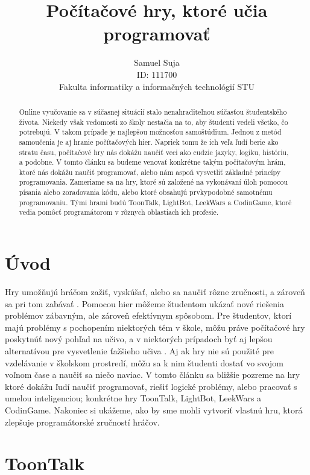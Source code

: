 \documentclass[slovak,a4paper,11pt]{article}
\title{Počítačové hry, ktoré učia programovať}
\author{Samuel Suja \\ ID: 111700 \\ Fakulta informatiky a informačných technológií STU}
\begin{document}
\maketitle
\tableofcontents

\begin{abstract}

Online vyučovanie sa v súčasnej situácií stalo nenahraditeľnou súčasťou študentského života. Niekedy však vedomosti zo školy nestačia na to, aby študenti vedeli všetko, čo potrebujú. V takom prípade je najlepšou možnosťou samoštúdium. Jednou z metód samoučenia je aj hranie počítačových hier. Napriek tomu že ich veľa ľudí berie ako stratu času, počítačové hry nás dokážu naučiť veci ako cudzie jazyky, logiku, históriu, a podobne. V tomto článku sa budeme venovať konkrétne takým počítačovým hrám, ktoré nás dokážu naučiť programovať, alebo nám aspoň vysvetliť základné princípy programovania. Zameriame sa na hry, ktoré sú založené na vykonávaní úloh pomocou písania alebo zoraďovania kódu, alebo ktoré obsahujú prvkypodobné samotnému programovaniu. Tými hrami budú ToonTalk, LightBot, LeekWars a CodinGame, ktoré vedia pomôcť programátorom v rôznych oblastiach ich profesie.

\end{abstract}

\section{Úvod}

Hry umožňujú hráčom zažiť, vyskúšať, alebo sa naučiť rôzne zručnosti, a zároveň sa pri tom zabávať \cite{burgos2007re}. Pomocou hier môžeme študentom ukázať nové riešenia problémov zábavným, ale zároveň efektívnym spôsobom. Pre študentov, ktorí majú problémy s pochopením niektorých tém v škole, môžu práve počítačové hry poskytnúť nový pohľad na učivo, a v niektorých prípadoch byť aj lepšou alternatívou pre vysvetlenie ťažšieho učiva \cite{seng2014computer}. Aj ak hry nie sú použité pre vzdelávanie v školskom prostredí, môžu sa k nim študenti dostať vo svojom voľnom čase a naučiť sa niečo naviac. V tomto článku sa bližšie pozreme na hry ktoré dokážu ľudí naučiť programovať, riešiť logické problémy, alebo pracovať s umelou inteligenciou; konkrétne hry ToonTalk, LightBot, LeekWars a CodinGame. Nakoniec si ukážeme, ako by sme mohli vytvoriť vlastnú hru, ktorá zlepšuje programátorské zručností hráčov.

\section{ToonTalk}
\end{document}
